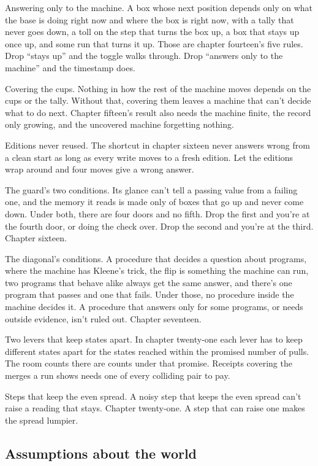 \documentclass[11pt,twoside]{article}
\theoremstyle{thielethm}
\theoremstyle{thieledef}
\theoremstyle{thieledef}
\theoremstyle{thieledef}
\theoremstyle{thielethm}
\theoremstyle{thieleobs}
\theoremstyle{thielethm}
\begin{document}
Answering only to the machine. A box whose next position depends only on what the base is doing right now and where the box is right now, with a tally that never goes down, a toll on the step that turns the box up, a box that stays up once up, and some run that turns it up. Those are chapter fourteen's five rules. Drop ``stays up'' and the toggle walks through. Drop ``answers only to the machine'' and the timestamp does.

Covering the cups. Nothing in how the rest of the machine moves depends on the cups or the tally. Without that, covering them leaves a machine that can't decide what to do next. Chapter fifteen's result also needs the machine finite, the record only growing, and the uncovered machine forgetting nothing.

Editions never reused. The shortcut in chapter sixteen never answers wrong from a clean start as long as every write moves to a fresh edition. Let the editions wrap around and four moves give a wrong answer.

The guard's two conditions. Its glance can't tell a passing value from a failing one, and the memory it reads is made only of boxes that go up and never come down. Under both, there are four doors and no fifth. Drop the first and you're at the fourth door, or doing the check over. Drop the second and you're at the third. Chapter sixteen.

The diagonal's conditions. A procedure that decides a question about programs, where the machine has Kleene's trick, the flip is something the machine can run, two programs that behave alike always get the same answer, and there's one program that passes and one that fails. Under those, no procedure inside the machine decides it. A procedure that answers only for some programs, or needs outside evidence, isn't ruled out. Chapter seventeen.

Two levers that keep states apart. In chapter twenty-one each lever has to keep different states apart for the states reached within the promised number of pulls. The room counts there are counts under that promise. Receipts covering the merges a run shows needs one of every colliding pair to pay.

Steps that keep the even spread. A noisy step that keeps the even spread can't raise a reading that stays. Chapter twenty-one. A step that can raise one makes the spread lumpier.

\subsection{Assumptions about the world}
\end{document}
